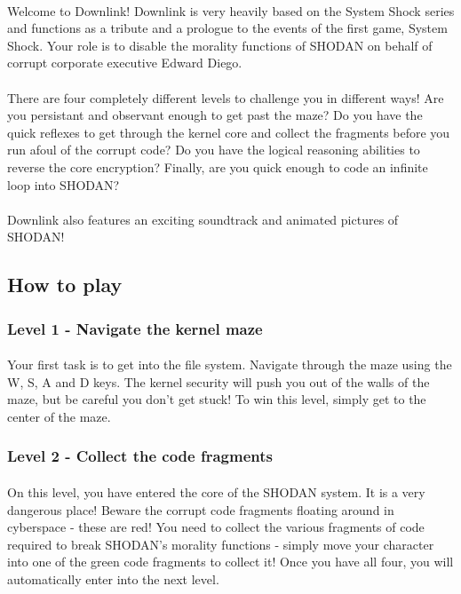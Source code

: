 \documentclass{article}
\begin{document}
\paragraph{}
Welcome to Downlink! Downlink is very heavily based on the System Shock series and functions as a tribute and a prologue to the events of the first game, System Shock. Your role is to disable the morality functions of SHODAN on behalf of corrupt corporate executive Edward Diego.
\paragraph{}
There are four completely different levels to challenge you in different ways! Are you persistant and observant enough to get past the maze? Do you have the quick reflexes to get through the kernel core and collect the fragments before you run afoul of the corrupt code? Do you have the logical reasoning abilities to reverse the core encryption? Finally, are you quick enough to code an infinite loop into SHODAN? 
\paragraph{}
Downlink also features an exciting soundtrack and animated pictures of SHODAN!
\subsection {How to play}
\subsubsection {Level 1 - Navigate the kernel maze}
\paragraph{}
Your first task is to get into the file system. Navigate through the maze using the W, S, A and D keys. The kernel security will push you out of the walls of the maze, but be careful you don't get stuck! To win this level, simply get to the center of the maze.
\subsubsection {Level 2 - Collect the code fragments}
\paragraph{}
On this level, you have entered the core of the SHODAN system. It is a very dangerous place! Beware the corrupt code fragments floating around in cyberspace - these are red! You need to collect the various fragments of code required to break SHODAN's morality functions - simply move your character into one of the green code fragments to collect it! Once you have all four, you will automatically enter into the next level.
\end{document}
